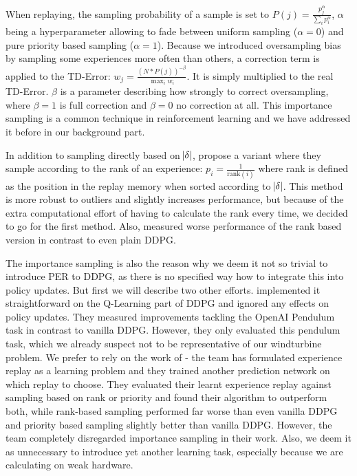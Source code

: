 \documentclass[hyperref,beleg]{cgvpub}
\begin{document}
When replaying, the sampling probability of a sample is set to $P(j) = \frac{p_j^{\alpha}}{\sum_i{p_i^{\alpha}}}$, $\alpha$ being a hyperparameter allowing to fade between uniform sampling ($\alpha=0$) and pure priority based sampling ($\alpha=1$). Because we introduced oversampling bias by sampling some experiences more often than others, a correction term is applied to the \ac{TD-Error}: $w_j = \frac{(N*P(j))^{-\beta}}{\max_i{w_i}}$. It is simply multiplied to the real \ac{TD-Error}. $\beta$ is a parameter describing how strongly to correct oversampling, where $\beta=1$ is full correction and $\beta=0$ no correction at all. This importance sampling is a common technique in reinforcement learning and we have addressed it before in our background part.

In addition to sampling directly based on $\abs{\delta}$, \cite{schaulPrioritizedExperienceReplay2016} propose a variant where they sample according to the rank of an experience: $p_i = \frac{1}{\text{rank}(i)}$ where rank is defined as the position in the replay memory when sorted according to $\abs{\delta}$. This method is more robust to outliers and slightly increases performance, but because of the extra computational effort of having to calculate the rank every time, we decided to go for the first method. Also, \cite{zhaExperienceReplayOptimization2019} measured worse performance of the rank based version in contrast to even plain \ac{DDPG}.

The importance sampling is also the reason why we deem it not so trivial to introduce \ac{PER} to \ac{DDPG}, as there is no specified way how to integrate this into policy updates. But first we will describe two other efforts. \cite{houImprovingDDPGPrioritized} implemented it straightforward on the Q-Learning part of \ac{DDPG} and ignored any effects on policy updates. They measured improvements tackling the OpenAI Pendulum task in contrast to vanilla \ac{DDPG}. However, they only evaluated this pendulum task, which we already suspect not to be representative of our windturbine problem. We prefer to rely on the work of \cite{zhaExperienceReplayOptimization2019} - the team has formulated experience replay as a learning problem and they trained another prediction network on which replay to choose. They evaluated their learnt experience replay against sampling based on rank or priority and found their algorithm to outperform both, while rank-based sampling performed far worse than even vanilla \ac{DDPG} and priority based sampling slightly better than vanilla \ac{DDPG}. However, the team completely disregarded importance sampling in their work. Also, we deem it as unnecessary to introduce yet another learning task, especially because we are calculating on weak hardware.
\end{document}
